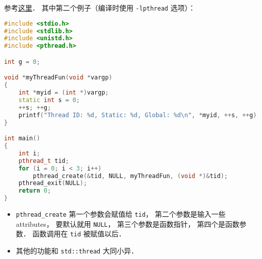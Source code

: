 
\begin{issues}
\issueDraft
\end{issues}

参考\href{https://www.geeksforgeeks.org/multithreading-c-2/}{这里}． 其中第二个例子（编译时使用 \verb|-lpthread| 选项）：
\begin{lstlisting}[language=cpp]
#include <stdio.h>
#include <stdlib.h>
#include <unistd.h>
#include <pthread.h>

int g = 0;

void *myThreadFun(void *vargp)
{
	int *myid = (int *)vargp;
	static int s = 0;
	++s; ++g;
	printf("Thread ID: %d, Static: %d, Global: %d\n", *myid, ++s, ++g);
}

int main()
{
	int i;
	pthread_t tid;
	for (i = 0; i < 3; i++)
		pthread_create(&tid, NULL, myThreadFun, (void *)&tid);
	pthread_exit(NULL);
	return 0;
}
\end{lstlisting}

\begin{itemize}
\item \verb|pthread_create| 第一个参数会赋值给 \verb|tid|， 第二个参数是输入一些 attributes， 要默认就用 \verb|NULL|， 第三个参数是函数指针， 第四个是函数参数． 函数调用在 \verb|tid| 被赋值以后．
\item 其他的功能和 \verb|std::thread| 大同小异．
\end{itemize}

